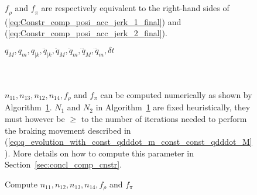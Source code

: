 \begin{figure}[!htbp]
$\textit{f}_{\rho}$ and $\textit{f}_{\pi}$ are respectively equivalent to the right-hand sides of (\ref{eq:Constr_comp_posi_acc_jerk_1_final}) and (\ref{eq:Constr_comp_posi_acc_jerk_2_final}). \\
\noindent\begin{minipage}{\textwidth}
\renewcommand\footnoterule{}                  %
\begin{algorithm}[H]
\caption{Compute $n_{11}, n_{12}, n_{13}, n_{14}, f_{\rho}$ and $f_{\pi}$}
\label{alg:compute_n_11_n_12_n_13_n_14_f_rho_f_pi}
\begin{algorithmic}[1]
\Require $q_M, q_m, q_{|k}, \ddot{q}_{|k},\ddot{q}_{M},\ddot{q}_{m},\dddot{q}_{M},\dddot{q}_{m}, \delta t$
\EndIf  
{}
\EndIf 
\EndFor
\EndFor
{}
\myState {}\;
\end{algorithmic}
\end{algorithm}
\end{minipage} \\
\\
$n_{11}, n_{13}, n_{12}, n_{14}, f_{\rho}$ and $f_{\pi}$ can be computed numerically as shown by Algorithm~\ref{alg:compute_n_11_n_12_n_13_n_14_f_rho_f_pi}. $N_1$ and $N_2$ in Algorithm~\ref{alg:compute_n_11_n_12_n_13_n_14_f_rho_f_pi} are fixed heuristically, they must however be $\geq$ to the number of iterations needed to perform the braking movement described in (\ref{eq:q_evolution_with_const_qdddot_m_const_const_qdddot_M}). More details on how to compute this parameter in Section~\ref{sec:concl_comp_cnstr}.

\end{figure}
